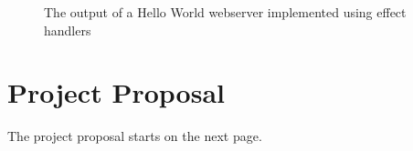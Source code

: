 \documentclass[%
    12pt,
    bibliography=toc,
    listof=leveldown,%
    oneside
]{book}
\begin{document}
\begin{appendices}
\begin{figure}
    \caption{The output of a Hello World webserver implemented using effect handlers}
    \label{fig:app-screenshot-webserver-hello-world}

\end{figure}

\chapter{Project Proposal}
\setcounter{page}{1}
The project proposal starts on the next page.


\end{appendices}
\end{document}
